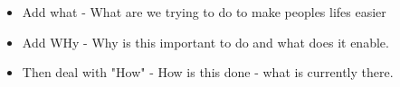 \documentclass{article}
\begin{document}

\begin{itemize}
\item Add what - What are we trying to do to make peoples lifes easier
\item Add WHy - Why is this important to do and what does it enable.
\item Then deal with "How" - How is this done - what is currently there. 
\end{itemize}
\end{document}
